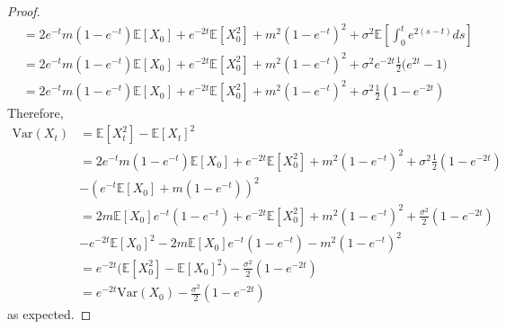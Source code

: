 \documentclass[11pt]{article}
\newcommand{\var}{\mrm{Var}}
\newcommand{\gs}{\sigma}
\newcommand{\mrm}{\mathrm}
\newcommand{\E}{\mathbb{E}}
\begin{document}
\begin{enumerate}
\begin{enumerate}
\begin{proof}
\begin{align*}
 &= 2 e^{-t}m(1-e^{-t}) \E[X_0] + e^{-2t}\E[X_0^2]+m^2(1-e^{-t})^2 + \gs^2 \E[  \int_0^t e^{2(s-t)} ds ]\\
  &= 2 e^{-t}m(1-e^{-t}) \E[X_0] + e^{-2t}\E[X_0^2]+m^2(1-e^{-t})^2 + \gs^2 e^{-2t}\frac{1}{2}\Big(e^{2t}-1 \Big)\\
  &= 2 e^{-t}m(1-e^{-t}) \E[X_0] + e^{-2t}\E[X_0^2]+m^2(1-e^{-t})^2 + \gs^2 \frac{1}{2}(1-e^{-2t})
 \end{align*}
 Therefore,
 \begin{align*}
  \var (X_t) &= \E [X_t^2] - \E [ X_t]^2\\
  &= 2 e^{-t}m(1-e^{-t}) \E[X_0] + e^{-2t}\E[X_0^2]+m^2(1-e^{-t})^2 + \gs^2 \frac{1}{2}(1-e^{-2t})\\
  &-(e^{-t} \E[X_0] + m(1-e^{-t}))^2\\
  &= 2 m \E[X_0]e^{-t}(1-e^{-t})  + e^{-2t}\E[X_0^2]+m^2(1-e^{-t})^2 +\frac{\gs^2}{2}(1-e^{-2t})\\ &- e^{-2t}\E[X_0]^2-2m \E[X_0] e^{-t} (1-e^{-t})-m^2(1-e^{-t})^2\\
  &= e^{-2t} \big( \E [X_0^2]- \E [X_0]^2 \big) - \frac{\gs^2}{2}(1-e^{-2t})\\
  &= e^{-2t} \var (X_0) -\frac{\gs^2}{2}(1-e^{-2t})
 \end{align*}
 as expected.
 \end{proof}
  \end{enumerate}
 \end{enumerate}
\end{document}
